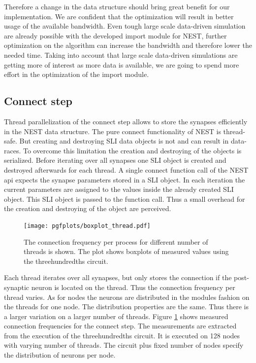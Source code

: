 Therefore a change in the data structure should bring great benefit for our implementation.
We are confident that the optimization will result in better usage of the available bandwidth.
Even tough large scale data-driven simulation are already possible with the developed import module for NEST,
further optimization on the algorithm can increase the bandwidth and therefore lower the needed time.
Taking into account that large scale data-driven simulations are getting more of interest as more 
data is available, we are going to spend more effort in the optimization of the import module.

\subsection{Connect step}
\label{sec:speedup:connect}
Thread parallelization of the connect step allows to store the synapses efficiently in the NEST data structure.
The pure connect functionality of NEST is thread-safe. But creating and destroying SLI data objects is not and can result
in data-races. To overcome this limitation the creation and destroying of the objects is serialized.
Before iterating over all synapses one SLI object is created and destroyed afterwards for each thread.
A single connect function call of the NEST api expects the synapse parameters stored in a SLI object.
In each iteration the current parameters are assigned to the values inside the already created SLI object.
This SLI object is passed to the function call.
Thus a small overhead for the creation and destroying of the object are perceived.
\begin{figure}[ht!]
\centering
\texttt{[image: pgfplots/boxplot\_thread.pdf]}
\caption{The connection frequency per process for different number of threads is shown.
The plot shows boxplots of measured values using the threehundredths circuit.}
\label{boxplotnewcon}
\end{figure}
Each thread iterates over all synapses, but only stores the connection if the post-synaptic neuron is located on
the thread. Thus the connection frequency per thread varies.
As for nodes the neurons are distributed in the modules fashion on the threads for one node.
The distribution properties are the same. Thus there is a larger variation on a larger number of threads.
Figure \ref{boxplotnewcon} shows measured connection frequencies for the connect step. The measurements are
extracted from the execution of the threehundredths circuit. It is executed on 128 nodes with varying number of
threads. The circuit plus fixed number of nodes specify the distribution of neurons per node.

